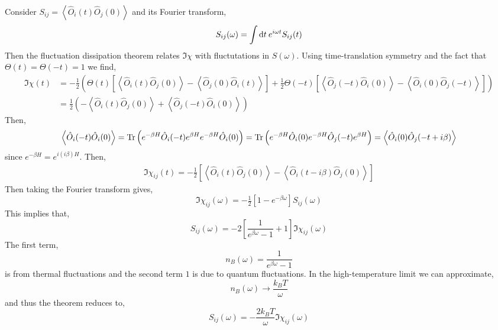 \documentclass[12pt]{article}
\begin{document}
Consider $S_{ij} = \left< \hat{O}_i(t) \hat{O}_j(0) \right>$ and its Fourier transform,
\[ S_{ij}(\omega) = \int \mathrm{d}t \: e^{i \omega t} S_{ij}(t) \]
Then the fluctuation dissipation theorem relates $\Im{\chi}$ with fluctutations in $S(\omega)$.  Using time-translation symmetry and the fact that $\Theta(t) = \Theta(-t) = 1$ we find,
\begin{align*}
\Im{\chi(t)} & = - \tfrac{1}{2} \left( \Theta(t) \left[ \left< \hat{O}_i(t) \hat{O}_j(0) \right> - \left< \hat{O}_j(0) \hat{O}_i(t) \right> \right] + \tfrac{1}{2} \Theta(-t) \left[ \left< \hat{O}_j(-t) \hat{O}_i(0) \right> - \left< \hat{O}_i(0) \hat{O}_j(-t) \right> \right] \right)
\\
& = \tfrac{1}{2} \left( - \left< \hat{O}_i(t) \hat{O}_j(0) \right> + \left< \hat{O}_j(-t) \hat{O}_i(0) \right> \right) 
\end{align*}
Then,
\[ \left< \hat{O}_i(-t) \hat{O}_i(0) \right> = \mathrm{Tr} \left( e^{-\beta H} \hat{O}_i(-t) e^{\beta H} e^{-\beta H} \hat{O}_i(0) \right) = \mathrm{Tr} \left( e^{-\beta H} \hat{O}_i(0) e^{-\beta H} \hat{O}_j(-t) e^{\beta H} \right) = \left< \hat{O}_i(0) \hat{O}_j(-t + i \beta) \right> \]
since $e^{-\beta H} = e^{i (i \beta) H}$. Then,
\begin{align*}
\Im{\chi_{ij}(t)} = - \tfrac{1}{2} \left[ \left< \hat{O}_i(t) \hat{O}_j(0) \right> - \left< \hat{O}_i(t - i \beta) \hat{O}_j(0) \right> \right] 
\end{align*}
Then taking the Fourier transform gives,
\[ \Im{\chi_{ij}(\omega)} = - \tfrac{1}{2} \left[ 1 - e^{-\beta \omega} \right] S_{ij}(\omega) \] 
This implies that,
\[ S_{ij}(\omega) = -2 \left[ \frac{1}{e^{\beta \omega} - 1} + 1 \right] \Im{\chi_{ij}(\omega)} \]
The first term,
\[ n_B(\omega) = \frac{1}{e^{\beta \omega} - 1} \]
is from thermal fluctuations and the second term $1$ is due to quantum fluctuations. In the high-temperature limit we can approximate, \[ n_B(\omega) \to \frac{k_B T}{\omega} \]
and thus the theorem reduces to,
\[ S_{ij}(\omega) = - \frac{2 k_B T}{\omega} \Im{\chi_{ij}(\omega)} \]
\end{document}
